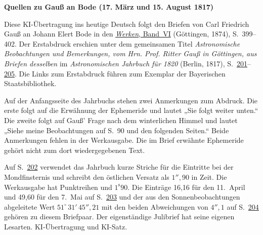 \clearpage\thispagestyle{empty}
\begin{center}\textbf{Quellen zu Gauß an Bode (17. März und 15. August 1817)}\end{center}
\noindent Diese KI-Übertragung ins heutige Deutsch folgt den Briefen von Carl Friedrich Gauß an Johann Elert Bode in den \href{https://gdz.sub.uni-goettingen.de/id/PPN236007467}{\textit{Werken}, Band~VI} (Göttingen, 1874), S.~399--402. Der Erstabdruck erschien unter dem gemeinsamen Titel \textit{Astronomische Beobachtungen und Bemerkungen, vom Hrn. Prof. Ritter Gauß in Göttingen, aus Briefen desselben} im \textit{Astronomischen Jahrbuch für 1820} (Berlin, 1817), S.~\href{https://api.digitale-sammlungen.de/iiif/image/v2/bsb10538349_00205/full/1600,/0/default.jpg}{201}--\href{https://api.digitale-sammlungen.de/iiif/image/v2/bsb10538349_00209/full/1600,/0/default.jpg}{205}. Die Links zum Erstabdruck führen zum Exemplar der Bayerischen Staatsbibliothek.
\par\smallskip\noindent Auf der Anfangsseite des Jahrbuchs stehen zwei Anmerkungen zum Abdruck. Die erste folgt auf die Erwähnung der Ephemeride und lautet „Sie folgt weiter unten.“ Die zweite folgt auf Gauß’ Frage nach dem winterlichen Himmel und lautet „Siehe meine Beobachtungen auf S.~90 und den folgenden Seiten.“ Beide Anmerkungen fehlen in der Werkausgabe. Die im Brief erwähnte Ephemeride gehört nicht zum dort wiedergegebenen Text.
\par\smallskip\noindent Auf S.~\href{https://api.digitale-sammlungen.de/iiif/image/v2/bsb10538349_00206/full/1600,/0/default.jpg}{202} verwendet das Jahrbuch kurze Striche für die Eintritte bei der Mondfinsternis und schreibt den östlichen Versatz als $1''{,}90$ in Zeit. Die Werkausgabe hat Punktreihen und $1^{\mathrm s}90$. Die Einträge 16,16 für den 11.~April und 49,60 für den 7.~Mai auf S.~\href{https://api.digitale-sammlungen.de/iiif/image/v2/bsb10538349_00207/full/1600,/0/default.jpg}{203} und der aus den Sonnenbeobachtungen abgeleitete Wert $51^\circ\,31'\,45''{,}21$ mit den beiden Abweichungen von $4''{,}1$ auf S.~\href{https://api.digitale-sammlungen.de/iiif/image/v2/bsb10538349_00208/full/1600,/0/default.jpg}{204} gehören zu diesem Briefpaar. Der eigenständige Julibrief hat seine eigenen Lesarten. KI-Übertragung und KI-Satz.
\clearpage
